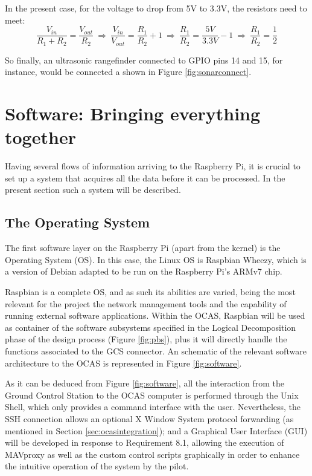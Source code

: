 

In the present case, for the voltage to drop from 5V to 3.3V, the resistors need to meet:
\begin{equation}
	\frac{V_{in}}{R_1+R_2}=\frac{V_{out}}{R_2} \ \Rightarrow\ \frac{V_{in}}{V_{out}}=\frac{R_1}{R_2}+1 \ \Rightarrow\ \frac{R_1}{R_2}=\frac{5V}{3.3V}-1 \ \Rightarrow\ \frac{R_1}{R_2}=\frac{1}{2} 
\end{equation}

So finally, an ultrasonic rangefinder connected to GPIO pins 14 and 15, for instance, would be connected a shown in Figure \ref{fig:sonarconnect}.




\section{Software: Bringing everything together}

Having several flows of information arriving to the Raspberry Pi, it is crucial to set up a system that acquires all the data before it can be processed. 
In the present section such a system will be described.

\subsection{The Operating System}

The first software layer on the Raspberry Pi (apart from the kernel) is the Operating System (OS).
In this case, the Linux OS is Raspbian Wheezy, which is a version of Debian adapted to be run on the Raspberry Pi's ARMv7 chip.

Raspbian is a complete OS, and as such its abilities are varied, being the most relevant for the project the network management tools and the capability of running external software applications.
Within the OCAS, Raspbian will be used as container of the software subsystems specified in the Logical Decomposition phase of the design process (Figure \ref{fig:pbs}), plus it will directly handle the functions associated to the GCS connector.
An schematic of the relevant software architecture to the OCAS is represented in Figure \ref{fig:software}.



As it can be deduced from Figure \ref{fig:software}, all the interaction from the Ground Control Station to the OCAS computer is performed through the Unix Shell, which only provides a command interface with the user.
Nevertheless, the SSH connection allows an optional X Window System protocol forwarding (as mentioned in Section \ref{sec:ocasintegration}); and a Graphical User Interface (GUI) will be developed in response to Requirement 8.1, allowing the execution of MAVproxy as well as the custom control scripts graphically in order to enhance the intuitive operation of the system by the pilot.

